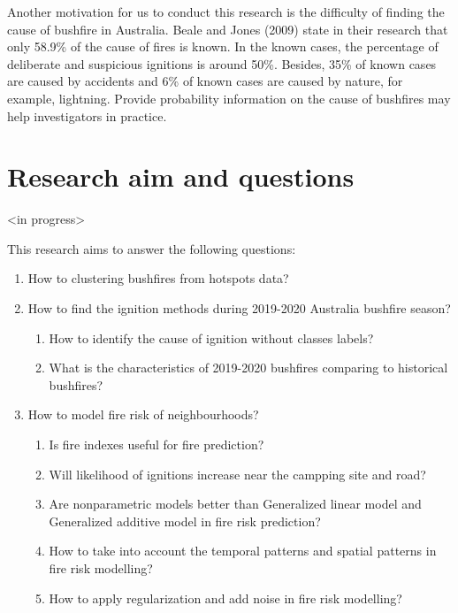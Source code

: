 \documentclass{monashthesis}
\begin{document}
Another motivation for us to conduct this research is the difficulty of
finding the cause of bushfire in Australia. Beale and Jones (2009) state
in their research that only 58.9\% of the cause of fires is known. In
the known cases, the percentage of deliberate and suspicious ignitions
is around 50\%. Besides, 35\% of known cases are caused by accidents and
6\% of known cases are caused by nature, for example, lightning. Provide
probability information on the cause of bushfires may help investigators
in practice.

\section{Research aim and questions}\label{research-aim-and-questions}

\textless{}in progress\textgreater{}

This research aims to answer the following questions:

\begin{enumerate}
\def\labelenumi{\arabic{enumi}.}
\item
  How to clustering bushfires from hotspots data?
\item
  How to find the ignition methods during 2019-2020 Australia bushfire
  season?

  \begin{enumerate}
  \def\labelenumii{\alph{enumii}.}
  \tightlist
  \item
    How to identify the cause of ignition without classes labels?
  \item
    What is the characteristics of 2019-2020 bushfires comparing to
    historical bushfires?
  \end{enumerate}
\item
  How to model fire risk of neighbourhoods?

  \begin{enumerate}
  \def\labelenumii{\alph{enumii}.}
  \tightlist
  \item
    Is fire indexes useful for fire prediction?
  \item
    Will likelihood of ignitions increase near the campping site and
    road?
  \item
    Are nonparametric models better than Generalized linear model and
    Generalized additive model in fire risk prediction?
  \item
    How to take into account the temporal patterns and spatial patterns
    in fire risk modelling?
  \item
    How to apply regularization and add noise in fire risk modelling?
  \end{enumerate}
\end{enumerate}
\end{document}
